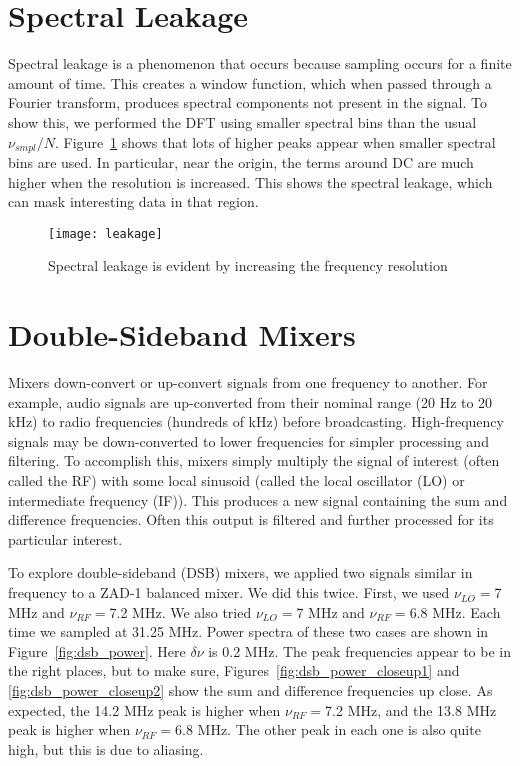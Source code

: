 \documentclass[12pt]{article}
\begin{document}
\section{Spectral Leakage}
Spectral leakage is a phenomenon that occurs because sampling occurs for a finite amount of time.
This creates a window function, which when passed through a Fourier transform, produces spectral components not present in the signal. 
To show this, we performed the DFT using smaller spectral bins than the usual $\nu_{smpl}/N$.
Figure~\ref{fig:leakage} shows that lots of higher peaks appear when smaller spectral bins are used.
In particular, near the origin, the terms around DC are much higher when the resolution is increased.
This shows the spectral leakage, which can mask interesting data in that region.

\begin{figure}
\centering
\texttt{[image: leakage]}
\caption{Spectral leakage is evident by increasing the frequency resolution}
\label{fig:leakage}
\end{figure}


\section{Double-Sideband Mixers}
Mixers down-convert or up-convert signals from one frequency to another.
For example, audio signals are up-converted from their nominal range (20 Hz to 20 kHz) to radio frequencies (hundreds of kHz) before broadcasting.
High-frequency signals may be down-converted to lower frequencies for simpler processing and filtering.
To accomplish this, mixers simply multiply the signal of interest (often called the RF) with some local sinusoid (called the local oscillator (LO) or intermediate frequency (IF)).
This produces a new signal containing the sum and difference frequencies.
Often this output is filtered and further processed for its particular interest.

To explore double-sideband (DSB) mixers, we applied two signals similar in frequency to a ZAD-1 balanced mixer.
We did this twice.
First, we used $\nu_{LO}=$7 MHz and $\nu_{RF}=$7.2 MHz.
We also tried $\nu_{LO}=$7 MHz and $\nu_{RF}=$6.8 MHz.
Each time we sampled at 31.25 MHz.
Power spectra of these two cases are shown in Figure~\ref{fig:dsb_power}.
Here $\delta\nu$ is 0.2 MHz.
The peak frequencies appear to be in the right places, but to make sure, Figures~\ref{fig:dsb_power_closeup1} and \ref{fig:dsb_power_closeup2} show the sum and difference frequencies up close.
As expected, the 14.2 MHz peak is higher when $\nu_{RF}=$7.2 MHz, and the 13.8 MHz peak is higher when $\nu_{RF}=$6.8 MHz.
The other peak in each one is also quite high, but this is due to aliasing.
\end{document}
